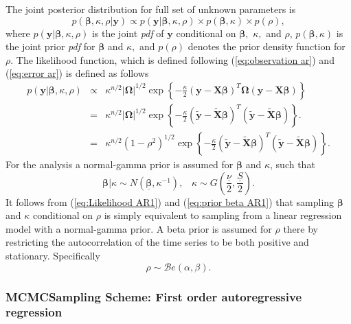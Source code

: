 \documentclass[article]{jss}
\begin{document}
The joint posterior distribution for full set of unknown parameters
is\begin{equation} p(\bm{\beta},\kappa,\rho|\bm{y})\propto
  p(\bm{y}|\bm{\beta},\kappa,\rho)\times p(\bm{\beta},\kappa)\times
  p(\rho),\label{eq:post_ar}\end{equation} where
$p(\bm{y}|\bm{\beta},\kappa,\rho)$ is the joint \emph{pdf} of $\bm{y}$
conditional on $\bm{\beta},$ $\kappa,$ and $\rho$,
$p(\bm{\beta},\kappa)$ is the joint prior \emph{pdf} for $\bm{\beta}$
and $\kappa,$ and $p(\rho)$ denotes the prior density function for
$\rho.$ The likelihood function, which is defined following
(\ref{eq:observation ar}) and (\ref{eq:error ar}) is defined as
follows\begin{eqnarray}
  p(\bm{y}|\bm{\beta},\kappa,\rho) & \propto & \kappa^{n/2}|\bm{\Omega}|^{1/2}\exp\left\{ -\frac{\kappa}{2}\left(\bm{y}-\bm{X}\bm{\beta}\right)^{T}\bm{\Omega}\left(\bm{y}-\bm{X}\bm{\beta}\right)\right\} \nonumber \\
  & = & \kappa^{n/2}|\bm{\Omega}|^{1/2}\exp\left\{ -\frac{\kappa}{2}\left(\tilde{\bm{y}}-\tilde{\bm{X}}\bm{\beta}\right)^{T}\left(\tilde{\bm{y}}-\tilde{\bm{X}}\bm{\beta}\right)\right\} .\nonumber \\
  & = & \kappa^{n/2}\left(1-\rho^{2}\right)^{1/2}\exp\left\{
    -\frac{\kappa}{2}\left(\tilde{\bm{y}}-\tilde{\bm{X}}\bm{\beta}\right)^{T}\left(\tilde{\bm{y}}-\tilde{\bm{X}}\bm{\beta}\right)\right\}
  .\label{eq:Likelihood AR1}\end{eqnarray} For the analysis a
normal-gamma prior is assumed for $\bm{\beta}$ and $\kappa$, such
that\begin{equation} \bm{\beta}|\kappa\sim
  N\left(\underline{\bm{\beta}},\kappa^{-1}\right),\,\,\,\,\,\kappa\sim
  G\left(\frac{\underline{\nu}}{2},\frac{\underline{S}}{2}\right).\label{eq:prior
    beta AR1}\end{equation} It follows from (\ref{eq:Likelihood AR1})
and (\ref{eq:prior beta AR1}) that sampling $\bm{\beta}$ and $\kappa$
conditional on $\rho$ is simply equivalent to sampling from a linear
regression model with a normal-gamma prior. A beta prior is assumed
for $\rho$ there by restricting the autocorrelation of the time series
to be both positive and stationary. Specifically\[
\rho\sim\mathcal{B}e\left(\alpha,\beta\right).\]



\subsubsection{MCMCSampling Scheme: First order autoregressive regression}
\end{document}
